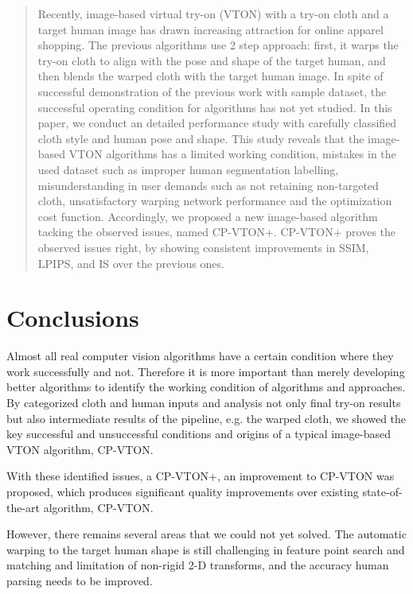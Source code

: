 \documentclass[runningheads]{llncs}
\begin{document}
\begin{abstract}

Recently, image-based virtual try-on (VTON) with a try-on cloth and a target human image has drawn increasing attraction for online apparel shopping. The previous algorithms use 2 step approach: first, it warps the try-on cloth to align with the pose and shape of the target human, and then blends the warped cloth with the target human image. In spite of successful demonstration of the previous work with sample dataset, the successful operating condition for algorithms has not yet studied. In this paper, we conduct an detailed performance study with carefully classified cloth style and human pose and shape. This study reveals that the image-based VTON algorithms has a limited working condition, mistakes in the used dataset such as  improper human segmentation labelling, misunderstanding in user demands such as not retaining non-targeted cloth, unsatisfactory warping network performance and the optimization cost function. Accordingly, we proposed a new image-based algorithm  tacking the observed issues, named CP-VTON+. CP-VTON+ proves  the observed issues right, by showing consistent improvements in SSIM, LPIPS, and IS over the previous ones.
       

\end{abstract}






\section{Conclusions}

Almost all real computer vision algorithms have a certain condition where they work successfully and not. Therefore it is more important than merely developing better algorithms to identify the working condition of algorithms and approaches.  By categorized cloth and human inputs and analysis not only final try-on results but also intermediate results of the pipeline, e.g. the warped cloth, we showed the key successful and unsuccessful conditions and origins of a typical image-based VTON algorithm, CP-VTON. 

With these identified issues, a CP-VTON+, an improvement to CP-VTON was proposed, which produces significant quality improvements over existing state-of-the-art algorithm, CP-VTON. 

However, there remains several areas that we could not yet solved. The automatic warping to the target human shape is still challenging in feature point search and matching and limitation of non-rigid 2-D transforms, and the accuracy human parsing  needs to be improved.
  
     
\clearpage
%
%


\end{document}
